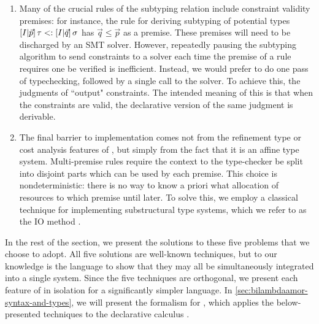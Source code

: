 \begin{enumerate}
  \item Many of the crucial rules of the \dlambdaamor subtyping relation include constraint validity premises: for instance, the rule for deriving subtyping of potential types $[I|\vec{p}] \, \tau <: [I|\vec{q}] \, \sigma$ has $\vec{q} \leq \vec{p}$ as a premise. These premises will need to be discharged by an SMT solver. However, repeatedly pausing the subtyping algorithm to send constraints to a solver each time the premise of a rule requires one be verified is inefficient. Instead, we would prefer to do one pass of typechecking, followed by a single call to the solver. To achieve this, the judgments of \bilambdaamor ``output" constraints. The intended meaning of this is that when the constraints are valid, the declarative version of the same judgment is derivable.
  
  \item The final barrier to implementation comes not from the refinement type or cost analysis features of \dlambdaamor, but simply from the fact that it is an affine type system. Multi-premise rules require the context to the type-checker be split into disjoint parts which can be used by each premise. This choice is nondeterministic: there is no way to know a priori what allocation of resources to which premise until later. To solve this, we employ a classical technique for implementing substructural type systems, which we refer to as the IO method \cite{cervesato:tcs00}.

\end{enumerate}

In the rest of the section, we present the solutions to these five problems that we choose to adopt. All five solutions are well-known techniques, but to our knowledge \bilambdaamor is the language to show that they may all be simultaneously integrated into a single system. Since the five techniques are orthogonal, we present each feature of \bilambdaamor in isolation for a significantly simpler language. In \autoref{sec:bilambdaamor-syntax-and-types}, we will present the formalism for \bilambdaamor, which applies the below-presented techniques to the declarative calculus \dlambdaamor.

